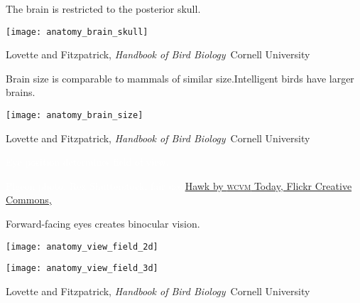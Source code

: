 \documentclass[t]{beamer}
\begin{document}
\begin{frame}[t,plain]{The brain is restricted to the posterior skull.}

	
	\texttt{[image: anatomy\_brain\_skull]}
		
	\vfilll
	
	\tiny \hfill Lovette and Fitzpatrick, \textit{Handbook of Bird Biology} \textcopyright\,Cornell University

\end{frame}

\begin{frame}[t,plain]{Brain size is comparable to mammals of similar size.\newline Intelligent birds have larger brains.}

	
	\texttt{[image: anatomy\_brain\_size]}
		
	\vfilll
	
	\tiny \hfill Lovette and Fitzpatrick, \textit{Handbook of Bird Biology} \textcopyright\,Cornell University

\end{frame}


{
\begin{frame}[b,plain]{\textcolor{white}{Eye position determines field of view.}}
	\tiny
	
	\textcolor{white}{Pigeon photo, Rex Shutterstock, fair use.\hfill \href{https://www.flickr.com/photos/60401146@N04/9271244216}{Hawk by \textsc{wcvm} Today, Flickr Creative Commons, }}
\end{frame}
}


\begin{frame}[t,plain]{Forward-facing eyes creates binocular vision.}

	\vspace{-\baselineskip}
	
	\begin{multicols}{2}
	
	\centering
	\texttt{[image: anatomy\_view\_field\_2d]} 
	
	\columnbreak
	
	\texttt{[image: anatomy\_view\_field\_3d]}
	
	\end{multicols}

	\vfilll
	
	\tiny \hfill Lovette and Fitzpatrick, \textit{Handbook of Bird Biology} \textcopyright\,Cornell University

\end{frame}
\end{document}
